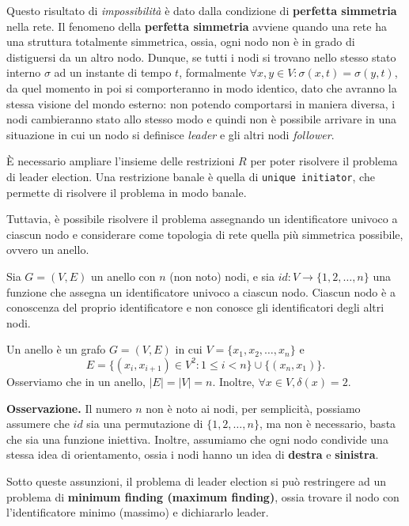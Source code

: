 Questo risultato di \textit{impossibilità} è dato dalla condizione di \textbf{perfetta simmetria} nella rete. Il fenomeno della \textbf{perfetta simmetria} avviene quando una rete ha una struttura totalmente simmetrica, ossia, ogni nodo non è in grado di distiguersi da un altro nodo. Dunque, se tutti i nodi si trovano nello stesso stato interno $\sigma$ ad un instante di tempo $t$, formalmente $\forall x,y \in V: \sigma(x, t) = \sigma(y,t)$, da quel momento in poi si comporteranno in modo identico, dato che avranno la stessa visione del mondo esterno: non potendo comportarsi in maniera diversa, i nodi cambieranno stato allo stesso modo e quindi non è possibile arrivare in una situazione in cui un nodo si definisce \textit{leader} e gli altri nodi \textit{follower}.

È necessario ampliare l'insieme delle restrizioni $R$ per poter risolvere il problema di leader election. Una restrizione banale è quella di \texttt{unique initiator}, che permette di risolvere il problema in modo banale. 

Tuttavia, è possibile risolvere il problema assegnando un identificatore univoco a ciascun nodo e considerare come topologia di rete quella più simmetrica possibile, ovvero un anello.

Sia $G = (V, E)$ un anello con $n$ (non noto) nodi, e sia $id: V \rightarrow \{1, 2, \dots, n\}$ una funzione che assegna un identificatore univoco a ciascun nodo. Ciascun nodo è a conoscenza del proprio identificatore e non conosce gli identificatori degli altri nodi.

\begin{definizione}[Anello]
    Un anello è un grafo $G = (V, E)$ in cui $V = \{x_1, x_2, \dots, x_n\}$ e 
    \[
        E = \{(x_i, x_{i+1}) \in V^2 : 1 \leq i < n\} \cup \{(x_n, x_1)\}.
    \]
    Osserviamo che in un anello, $|E| = |V| = n$. Inoltre, $\forall x \in V, \delta(x) = 2$.
\end{definizione}

\textbf{Osservazione.} Il numero $n$ non è noto ai nodi, per semplicità, possiamo assumere che $id$ sia una permutazione di $\{1, 2, \dots, n\}$, ma non è necessario, basta che sia una funzione iniettiva. Inoltre, assumiamo che ogni nodo condivide una stessa idea di orientamento, ossia i nodi hanno un idea di \textbf{destra} e \textbf{sinistra}.

Sotto queste assunzioni, il problema di leader election si può restringere ad un problema di \textbf{minimum finding (maximum finding)}, ossia trovare il nodo con l'identificatore minimo (massimo) e dichiararlo leader.

